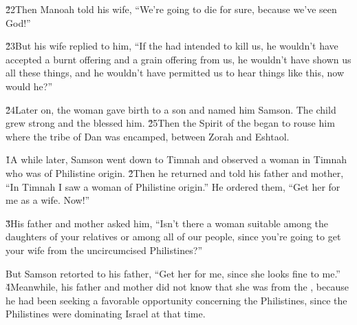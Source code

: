 \v{22}Then Manoah told his wife, ``We're going to die for sure, because we've seen God!''

\v{23}But his wife replied to him, ``If the  had intended to kill us, he wouldn't have accepted a burnt offering and a grain offering from us, he wouldn't have shown us all these things, and he wouldn't have permitted us to hear things like this, now would he?''

\v{24}Later on, the woman gave birth to a son and named him Samson. The child grew strong and the  blessed him. \v{25}Then the Spirit of the  began to rouse him where the tribe of Dan was encamped, between Zorah and Eshtaol.

\v{1}A while later, Samson went down to Timnah and observed a woman in Timnah who was of Philistine origin. \v{2}Then he returned and told his father and mother, ``In Timnah I saw a woman of Philistine origin.'' He ordered them, ``Get her for me as a wife. Now!''

\v{3}His father and mother asked him, ``Isn't there a woman suitable among the daughters of your relatives or among all of our people, since you're going to get your wife from the uncircumcised Philistines?''

But Samson retorted to his father, ``Get her for me, since she looks fine to me.'' \v{4}Meanwhile, his father and mother did not know that she was from the , because he had been seeking a favorable opportunity concerning the Philistines, since the Philistines were dominating Israel at that time.

